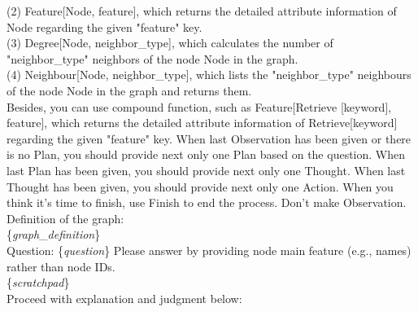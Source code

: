 \documentclass[11pt]{article}
\begin{document}
\begin{tcolorbox}[colback=white!10!white, colframe=blue!30!black, title=, boxrule=1pt]
\justifying
\noindent
(2) Feature[Node, feature], which returns the detailed attribute information of Node regarding the given "feature" key.\\
(3) Degree[Node, neighbor\_type], which calculates the number of "neighbor\_type" neighbors of the node Node in the graph.\\
(4) Neighbour[Node, neighbor\_type], which lists the "neighbor\_type" neighbours of the node Node in the graph and returns them.\\
Besides, you can use compound function, such as Feature[Retrieve [keyword], feature], 
which returns the detailed attribute information of Retrieve[keyword] regarding the given "feature" key.
When last Observation has been given or there is no Plan, you should provide next only one Plan based on the question. When last Plan has been given, you should provide next only one Thought. When last Thought has been given, you should provide next only one Action. When you think it's time to finish, use Finish to end the process. Don't make Observation.\\
Definition of the graph: \\\{\textit{graph}\_\textit{definition}\}\\
Question: \{\textit{question}\} Please answer by providing node main feature (e.g., names) rather than node IDs.\\\{\textit{scratchpad}\}\\
Proceed with explanation and judgment below:
\end{tcolorbox}
\end{document}

